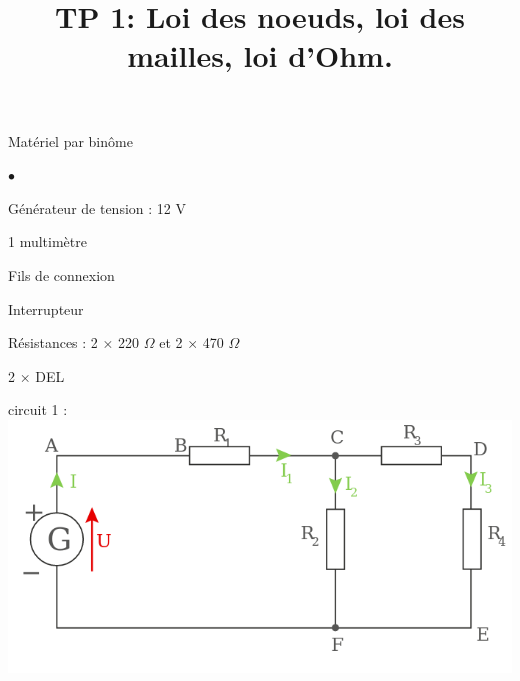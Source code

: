 \documentclass[10pt]{article}
\newcommand{\titreActivite}{\huge TP 1: Loi des noeuds, loi des mailles, loi d'Ohm.} %
\begin{document}
\date{}
\title{\titreActivite}
\maketitle %


\begin{minipage}[c]{0.45\textwidth}
	\begin{documentpeda}{Matériel par binôme}
		\begin{list}{$\bullet$}{}
			\item Générateur de tension : 12 V
			\item 1 multimètre
			\item Fils de connexion
			\item Interrupteur
			\item Résistances : 2 × 220 $Ω$ et 2 × 470 $Ω$
			\item 2 × DEL
		\end{list}
	\end{documentpeda}
\end{minipage}
\hspace{0.05\textwidth}
\begin{minipage}[c]{0.45\textwidth}
	\begin{center}
		circuit 1 : \vspace{5pt}
		\includegraphics[width=\columnwidth]{c1.png}
	\end{center}
\end{minipage}

\end{document}
